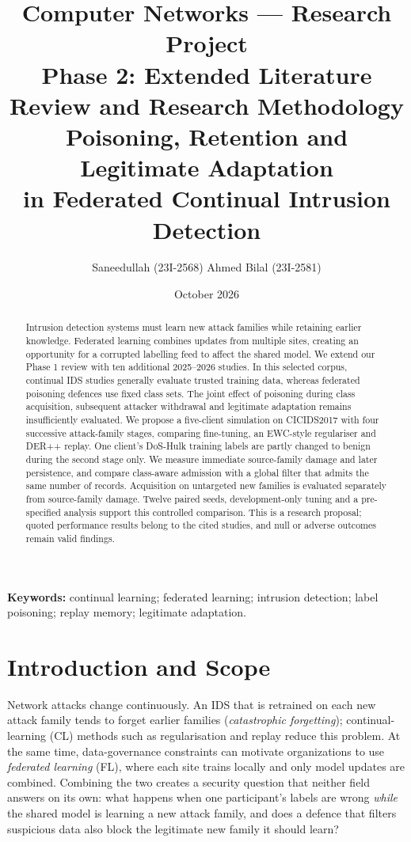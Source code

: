 \documentclass[10pt,a4paper]{article}
\title{\textbf{Computer Networks --- Research Project}\\[4pt]
\large Phase 2: Extended Literature Review and Research Methodology\\[8pt]
\Large Poisoning, Retention and Legitimate Adaptation\\in Federated Continual Intrusion Detection}
\author{Saneedullah (23I-2568) \qquad Ahmed Bilal (23I-2581)}
\date{October 2026}
\begin{document}
\maketitle

\begin{abstract}
Intrusion detection systems must learn new attack families while retaining earlier knowledge. Federated learning combines updates from multiple sites, creating an opportunity for a corrupted labelling feed to affect the shared model. We extend our Phase 1 review with ten additional 2025--2026 studies. In this selected corpus, continual IDS studies generally evaluate trusted training data, whereas federated poisoning defences use fixed class sets. The joint effect of poisoning during class acquisition, subsequent attacker withdrawal and legitimate adaptation remains insufficiently evaluated. We propose a five-client simulation on CICIDS2017 with four successive attack-family stages, comparing fine-tuning, an EWC-style regulariser and DER++ replay. One client's DoS-Hulk training labels are partly changed to benign during the second stage only. We measure immediate source-family damage and later persistence, and compare class-aware admission with a global filter that admits the same number of records. Acquisition on untargeted new families is evaluated separately from source-family damage. Twelve paired seeds, development-only tuning and a pre-specified analysis support this controlled comparison. This is a research proposal; quoted performance results belong to the cited studies, and null or adverse outcomes remain valid findings.
\end{abstract}

\noindent\textbf{Keywords:} continual learning; federated learning; intrusion detection; label poisoning; replay memory; legitimate adaptation.

\section{Introduction and Scope}
Network attacks change continuously. An IDS that is retrained on each new attack family tends to forget earlier families (\emph{catastrophic forgetting}); continual-learning (CL) methods such as regularisation and replay reduce this problem. At the same time, data-governance constraints can motivate organizations to use \emph{federated learning} (FL), where each site trains locally and only model updates are combined. Combining the two creates a security question that neither field answers on its own: what happens when one participant's labels are wrong \emph{while} the shared model is learning a new attack family, and does a defence that filters suspicious data also block the legitimate new family it should learn?
\end{document}
